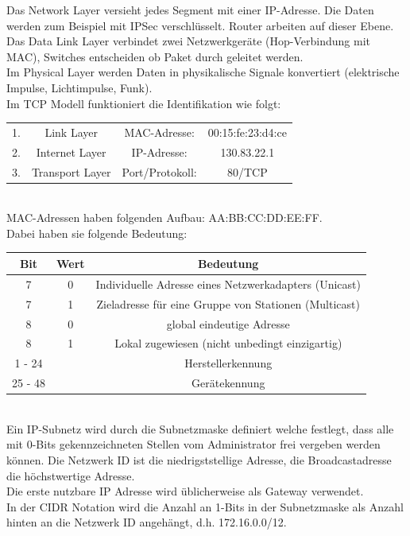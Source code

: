 \documentclass[a4paper,12pt,leqno]{article}
\begin{document}
Das Network Layer versieht jedes Segment mit einer IP-Adresse. Die Daten werden zum Beispiel mit IPSec verschlüsselt. Router arbeiten auf dieser Ebene.\\

Das Data Link Layer verbindet zwei Netzwerkgeräte (Hop-Verbindung mit MAC), Switches entscheiden ob Paket durch geleitet werden.\\

Im Physical Layer werden Daten in physikalische Signale konvertiert (elektrische Impulse, Lichtimpulse, Funk).\\

Im TCP Modell funktioniert die Identifikation wie folgt:\\
\begin{tabular}{lccc}
1. & Link Layer & MAC-Adresse: & 00:15:fe:23:d4:ce\\
2. & Internet Layer & IP-Adresse:& 130.83.22.1\\
3. & Transport Layer & Port/Protokoll:& 80/TCP  
\end{tabular}\\

MAC-Adressen haben folgenden Aufbau: AA:BB:CC:DD:EE:FF.\\
Dabei haben sie folgende Bedeutung:\\

\begin{tabular}{|c|c|c|}
\hline
Bit & Wert & Bedeutung\\
\hline
 7 & 0 & Individuelle Adresse eines Netzwerkadapters (Unicast)\\
 7 & 1 & Zieladresse für eine Gruppe von Stationen (Multicast)\\
\hline
 8 & 0 & global eindeutige Adresse\\
 8 & 1 & Lokal zugewiesen (nicht unbedingt einzigartig)\\
 \hline
 1 - 24 & & Herstellerkennung\\
 \hline
 25 - 48 & & Gerätekennung\\
 \hline
\end{tabular}\\

Ein IP-Subnetz wird durch die Subnetzmaske definiert welche festlegt, dass alle mit 0-Bits gekennzeichneten Stellen vom Administrator frei vergeben werden können. Die Netzwerk ID ist die niedrigststellige Adresse, die Broadcastadresse die höchstwertige Adresse.\\
Die erste nutzbare IP Adresse wird üblicherweise als Gateway verwendet.\\
In der CIDR Notation wird die Anzahl an 1-Bits in der Subnetzmaske als Anzahl hinten an die Netzwerk ID angehängt, d.h. 172.16.0.0/12.\\
\end{document}
